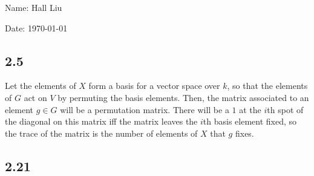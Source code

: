 \documentclass{article}
\begin{document}
Name: Hall Liu

Date: \today 
\vspace{1.5cm}

\subsection*{2.5}
Let the elements of $X$ form a basis for a vector space over $k$, so that the elements of $G$ act on $V$ by permuting the basis elements. Then, the matrix associated to an element $g\in G$ will be a permutation matrix. There will be a $1$ at the $i$th spot of the diagonal on this matrix iff the matrix leaves the $i$th basis element fixed, so the trace of the matrix is the number of elements of $X$ that $g$ fixes.
\subsection*{2.21}
\end{document}
